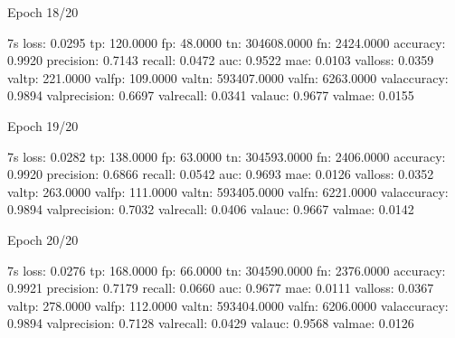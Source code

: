 \documentclass[letterpaper,10pt,english]{sphinxmanual}
\begin{document}
\begin{sphinxVerbatim}[commandchars=\\\{\}]
Epoch 18/20
\end{sphinxVerbatim}

\begin{sphinxVerbatim}[commandchars=\\\{\}]
 \PYGZhy{} 7s \PYGZhy{} loss: 0.0295 \PYGZhy{} tp: 120.0000 \PYGZhy{} fp: 48.0000 \PYGZhy{} tn: 304608.0000 \PYGZhy{} fn: 2424.0000 \PYGZhy{} accuracy: 0.9920 \PYGZhy{} precision: 0.7143 \PYGZhy{} recall: 0.0472 \PYGZhy{} auc: 0.9522 \PYGZhy{} mae: 0.0103 \PYGZhy{} val\PYGZus{}loss: 0.0359 \PYGZhy{} val\PYGZus{}tp: 221.0000 \PYGZhy{} val\PYGZus{}fp: 109.0000 \PYGZhy{} val\PYGZus{}tn: 593407.0000 \PYGZhy{} val\PYGZus{}fn: 6263.0000 \PYGZhy{} val\PYGZus{}accuracy: 0.9894 \PYGZhy{} val\PYGZus{}precision: 0.6697 \PYGZhy{} val\PYGZus{}recall: 0.0341 \PYGZhy{} val\PYGZus{}auc: 0.9677 \PYGZhy{} val\PYGZus{}mae: 0.0155
\end{sphinxVerbatim}

\begin{sphinxVerbatim}[commandchars=\\\{\}]
Epoch 19/20
\end{sphinxVerbatim}

\begin{sphinxVerbatim}[commandchars=\\\{\}]
 \PYGZhy{} 7s \PYGZhy{} loss: 0.0282 \PYGZhy{} tp: 138.0000 \PYGZhy{} fp: 63.0000 \PYGZhy{} tn: 304593.0000 \PYGZhy{} fn: 2406.0000 \PYGZhy{} accuracy: 0.9920 \PYGZhy{} precision: 0.6866 \PYGZhy{} recall: 0.0542 \PYGZhy{} auc: 0.9693 \PYGZhy{} mae: 0.0126 \PYGZhy{} val\PYGZus{}loss: 0.0352 \PYGZhy{} val\PYGZus{}tp: 263.0000 \PYGZhy{} val\PYGZus{}fp: 111.0000 \PYGZhy{} val\PYGZus{}tn: 593405.0000 \PYGZhy{} val\PYGZus{}fn: 6221.0000 \PYGZhy{} val\PYGZus{}accuracy: 0.9894 \PYGZhy{} val\PYGZus{}precision: 0.7032 \PYGZhy{} val\PYGZus{}recall: 0.0406 \PYGZhy{} val\PYGZus{}auc: 0.9667 \PYGZhy{} val\PYGZus{}mae: 0.0142
\end{sphinxVerbatim}

\begin{sphinxVerbatim}[commandchars=\\\{\}]
Epoch 20/20
\end{sphinxVerbatim}

\begin{sphinxVerbatim}[commandchars=\\\{\}]
 \PYGZhy{} 7s \PYGZhy{} loss: 0.0276 \PYGZhy{} tp: 168.0000 \PYGZhy{} fp: 66.0000 \PYGZhy{} tn: 304590.0000 \PYGZhy{} fn: 2376.0000 \PYGZhy{} accuracy: 0.9921 \PYGZhy{} precision: 0.7179 \PYGZhy{} recall: 0.0660 \PYGZhy{} auc: 0.9677 \PYGZhy{} mae: 0.0111 \PYGZhy{} val\PYGZus{}loss: 0.0367 \PYGZhy{} val\PYGZus{}tp: 278.0000 \PYGZhy{} val\PYGZus{}fp: 112.0000 \PYGZhy{} val\PYGZus{}tn: 593404.0000 \PYGZhy{} val\PYGZus{}fn: 6206.0000 \PYGZhy{} val\PYGZus{}accuracy: 0.9894 \PYGZhy{} val\PYGZus{}precision: 0.7128 \PYGZhy{} val\PYGZus{}recall: 0.0429 \PYGZhy{} val\PYGZus{}auc: 0.9568 \PYGZhy{} val\PYGZus{}mae: 0.0126
\end{sphinxVerbatim}
\end{document}
